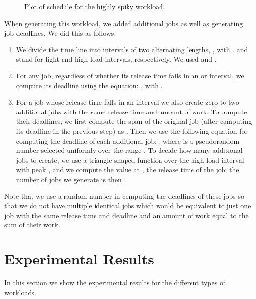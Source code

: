 \documentclass[11pt]{article}
\begin{document}
\begin{figure}
\centering
{}
\caption{Plot of  schedule for the highly spiky workload.}
\label{fig:YDS_High}
\end{figure}

When generating this workload, we added additional jobs as well as
generating job deadlines.
We did this as follows:
\begin{enumerate}
\item We divide the time line into intervals of two alternating
  lengths, , with .  and  stand for light and high
  load intervals, respectively. We used  and . 
\item For any job, regardless of whether its release time falls in an
   or  interval, we compute its deadline using the equation:
  , with .
\item For a job whose release time falls in an  interval we also
  create zero to two additional jobs with the same release time and
  amount of work. To compute their deadlines, we first compute the
  span of the original job (after computing its deadline in the
  previous step) as . Then we use the following equation
  for computing the deadline of each additional job:
	  , 
  where  is a pseudorandom number selected uniformly over the range
  .
  To decide how many additional jobs to 
  create, we use a triangle shaped function  over the
  high load interval with peak , and we compute the            
  value  at , the release time of the job; the
  number of jobs we generate is then . 
\end{enumerate}

Note that we use a random number in computing the deadlines of these
jobs so that we do not have multiple identical jobs which would be
equivalent to just one job with the same release time and
deadline and an amount of work equal to the sum of their work. 



\section{Experimental Results} 
\label{sec:results}

In this section we show the experimental results for the different
types of workloads. 
\end{document}
